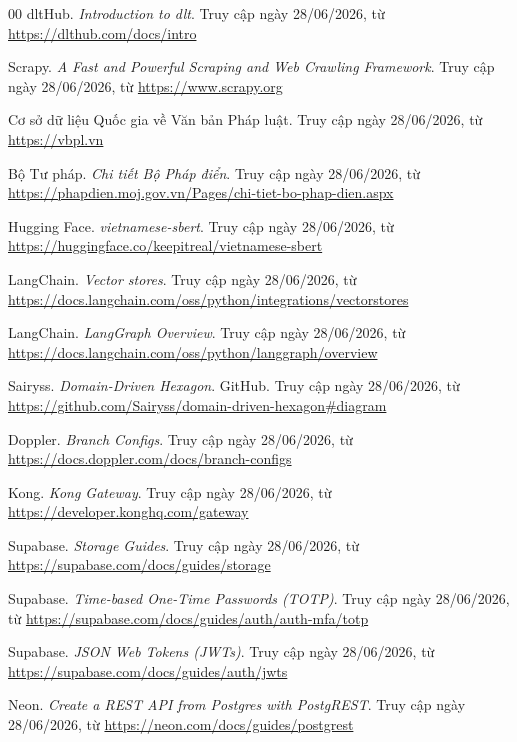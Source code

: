 \begin{thebibliography}{00}
dltHub. \textit{Introduction to dlt}. Truy cập ngày 28/06/2026, từ \url{https://dlthub.com/docs/intro}

Scrapy. \textit{A Fast and Powerful Scraping and Web Crawling Framework}. Truy cập ngày 28/06/2026, từ \url{https://www.scrapy.org}

Cơ sở dữ liệu Quốc gia về Văn bản Pháp luật. Truy cập ngày 28/06/2026, từ \url{https://vbpl.vn}

Bộ Tư pháp. \textit{Chi tiết Bộ Pháp điển}. Truy cập ngày 28/06/2026, từ \url{https://phapdien.moj.gov.vn/Pages/chi-tiet-bo-phap-dien.aspx}

Hugging Face. \textit{vietnamese-sbert}. Truy cập ngày 28/06/2026, từ \url{https://huggingface.co/keepitreal/vietnamese-sbert}

LangChain. \textit{Vector stores}. Truy cập ngày 28/06/2026, từ \url{https://docs.langchain.com/oss/python/integrations/vectorstores}

LangChain. \textit{LangGraph Overview}. Truy cập ngày 28/06/2026, từ \url{https://docs.langchain.com/oss/python/langgraph/overview}

Sairyss. \textit{Domain-Driven Hexagon}. GitHub. Truy cập ngày 28/06/2026, từ \url{https://github.com/Sairyss/domain-driven-hexagon#diagram}

Doppler. \textit{Branch Configs}. Truy cập ngày 28/06/2026, từ \url{https://docs.doppler.com/docs/branch-configs}

Kong. \textit{Kong Gateway}. Truy cập ngày 28/06/2026, từ \url{https://developer.konghq.com/gateway}

Supabase. \textit{Storage Guides}. Truy cập ngày 28/06/2026, từ \url{https://supabase.com/docs/guides/storage}

Supabase. \textit{Time-based One-Time Passwords (TOTP)}. Truy cập ngày 28/06/2026, từ \url{https://supabase.com/docs/guides/auth/auth-mfa/totp}

Supabase. \textit{JSON Web Tokens (JWTs)}. Truy cập ngày 28/06/2026, từ \url{https://supabase.com/docs/guides/auth/jwts}

Neon. \textit{Create a REST API from Postgres with PostgREST}. Truy cập ngày 28/06/2026, từ \url{https://neon.com/docs/guides/postgrest}


\end{thebibliography}
